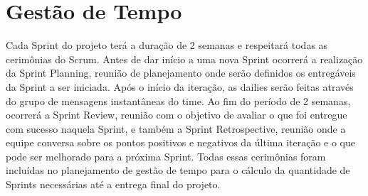 \section{Gestão de Tempo}
Cada Sprint do projeto terá a duração de 2 semanas e respeitará todas as cerimônias do Scrum. Antes de dar início a uma nova Sprint ocorrerá a realização da Sprint Planning, reunião de planejamento onde serão definidos os entregáveis da Sprint a ser iniciada. Após o início da iteração, as dailies serão feitas através do grupo de mensagens instantâneas do time. Ao fim do período de 2 semanas, ocorrerá a Sprint Review, reunião com o objetivo de avaliar o que foi entregue com sucesso naquela Sprint, e também a Sprint Retrospective, reunião onde a equipe conversa sobre os pontos positivos e negativos da última iteração e o que pode ser melhorado para a próxima Sprint. Todas essas cerimônias foram incluídas no planejamento de gestão de tempo para o cálculo da quantidade de Sprints necessárias até a entrega final do projeto.